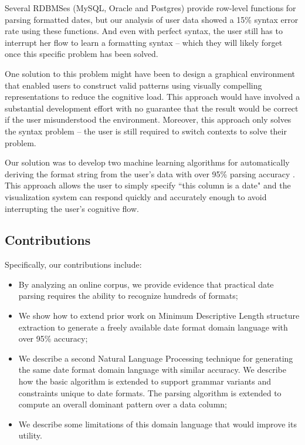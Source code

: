 Several RDBMSes (\eg MySQL, Oracle and Postgres) provide row-level functions for parsing formatted dates, but our analysis of user data showed a 15\% syntax error rate using these functions. And even with perfect syntax, the user still has to interrupt her flow to learn a formatting syntax -- which they will likely forget once this specific problem has been solved.

One solution to this problem might have been to design a graphical environment that enabled users to construct valid patterns using visually compelling representations to reduce the cognitive load. This approach would have involved a substantial development effort with no guarantee that the result would be correct if the user misunderstood the environment. Moreover, this approach only solves the syntax problem -- the user is still required to switch contexts to solve their problem.

Our solution was to develop two machine learning algorithms for automatically deriving the format string from the user's data with over 95\% parsing accuracy . This approach allows the user to simply specify ``this column is a date" and the visualization system can respond quickly and accurately enough to avoid interrupting the user's cognitive flow.

\subsection{Contributions}

Specifically, our contributions include:
\begin{itemize}
\item By analyzing an online corpus, we provide evidence that practical date parsing requires the ability to recognize hundreds of formats;
\item We show how to extend prior work on Minimum Descriptive Length structure extraction to generate a freely available date format domain language with over 95\% accuracy;
\item We describe a second Natural Language Processing technique for generating the same date format domain language with similar accuracy. We describe how the basic algorithm is extended to support grammar variants and constraints unique to date formats. The parsing algorithm is extended to compute an overall dominant pattern over a data column;
\item We describe some limitations of this domain language that would improve its utility.
\end{itemize}

